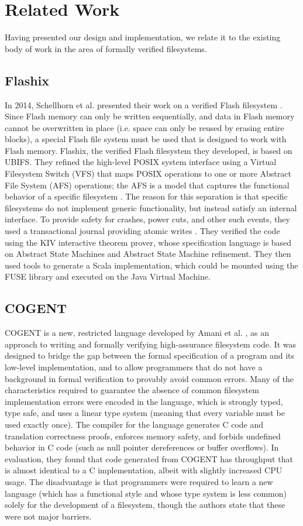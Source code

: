 \section{Related Work} \label{sec:related work}
Having presented our design and implementation, we relate it to the existing body of work in the area of formally verified filesystems.

\subsection{Flashix}
In 2014, Schellhorn et al. presented their work on a verified Flash filesystem \cite{schellhorn2014}.
Since Flash memory can only be written sequentially, and data in Flash memory cannot be overwritten in place (i.e. space can only be reused by erasing entire blocks), a special Flash file system must be used that is designed to work with Flash memory.
Flashix, the verified Flash filesystem they developed, is based on UBIFS.
They refined the high-level POSIX system interface using a Virtual Filesystem Switch (VFS) that maps POSIX operations to one or more Abstract File System (AFS) operations; the AFS is a model that captures the functional behavior of a specific filesystem \cite{ernst2012}.
The reason for this separation is that specific filesystems do not implement generic functionality, but instead satisfy an internal interface.
To provide safety for crashes, power cuts, and other such events, they used a transactional journal providing atomic writes \cite{ernst2015}.
They verified the code using the KIV interactive theorem prover, whose specification language is based on Abstract State Machines and Abstract State Machine refinement.
They then used tools to generate a Scala implementation, which could be mounted using the FUSE library and executed on the Java Virtual Machine.

\subsection{COGENT}
COGENT is a new, restricted language developed by Amani et al. \cite{amani2016}, as an approach to writing and formally verifying high-assurance filesystem code.
It was designed to bridge the gap between the formal specification of a program and its low-level implementation, and to allow programmers that do not have a background in formal verification to provably avoid common errors.
Many of the characteristics required to guarantee the absence of common filesystem implementation errors were encoded in the language, which is strongly typed, type safe, and uses a linear type system (meaning that every variable must be used exactly once).
The compiler for the language generates C code and translation correctness proofs, enforces memory safety, and forbids undefined behavior in C code (such as null pointer dereferences or buffer overflows).
In evaluation, they found that code generated from COGENT has throughput that is almost identical to a C implementation, albeit with slightly increased CPU usage.
The disadvantage is that programmers were required to learn a new language (which has a functional style and whose type system is less common) solely for the development of a filesystem, though the authors state that these were not major barriers.

